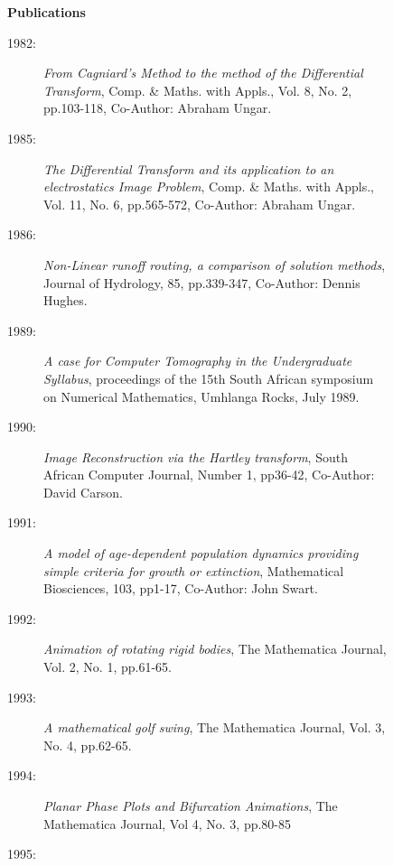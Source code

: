 \begin{description}\item[] \begin{description}\item[] {\bf  Publications  }
\begin{description}
\item[1982:]
      {\it From Cagniard's Method to the method of the Differential Transform},
      Comp. \& Maths. with Appls., Vol. 8, No. 2, pp.103-118, Co-Author:
      Abraham Ungar.\newline
\item[1985:]
      {\it The Differential Transform and its application to an electrostatics
      Image Problem}, Comp. \& Maths. with Appls., Vol. 11, No. 6,
      pp.565-572, Co-Author: Abraham Ungar.\newline
\item[1986:]
      {\it Non-Linear runoff routing, a comparison of solution methods},
      Journal of Hydrology, 85, pp.339-347, Co-Author: Dennis Hughes.\newline
\item[1989:]
      {\it A case for Computer Tomography in the Undergraduate
      Syllabus}, proceedings of the 15th South African symposium on
      Numerical Mathematics, Umhlanga Rocks, July 1989.\newline
\item[1990:]
      {\it Image Reconstruction via the Hartley transform}, South
      African Computer Journal, Number 1, pp36-42, Co-Author:
      David Carson.\newline
\item[1991:]
      {\it A model of age-dependent population dynamics providing simple criteria
      for growth or extinction}, Mathematical Biosciences, 103, pp1-17,
      Co-Author: John Swart.\newline
\item[1992:]
      {\it Animation of rotating rigid bodies}, The Mathematica Journal,
      Vol. 2, No. 1, pp.61-65.\newline
\item[1993:]
      {\it A mathematical golf swing}, The Mathematica Journal,
      Vol. 3, No. 4, pp.62-65. \newline
\item[1994:]
       {\it Planar Phase Plots and Bifurcation Animations},
       The Mathematica Journal, Vol 4, No. 3, pp.80-85 \newline
\item[1995:]

\end{description}
\end{description}
\end{description}
